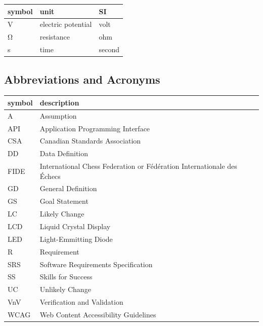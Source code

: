 \documentclass[12pt]{article}
\begin{document}
\begin{table}[ht]
  \noindent \begin{tabular}{l l l} 
    \toprule		
    \textbf{symbol} & \textbf{unit} & \textbf{SI}\\
    \midrule 
    \si{\volt} & electric potential & volt\\
    \si{\ohm} & resistance	& ohm\\
    \si{\second} & time & second\\
    \bottomrule
  \end{tabular}
\end{table}

\subsection{Abbreviations and Acronyms}
\begin{tabular}{l l} 
  \toprule		
  \textbf{symbol} & \textbf{description}\\
  \midrule 
  A & Assumption\\
  API & Application Programming Interface\\
  CSA & Canadian Standards Association\\
  DD & Data Definition\\
  FIDE & International Chess Federation or Fédération Internationale des Échecs\\
  GD & General Definition\\
  GS & Goal Statement\\
  LC & Likely Change\\
  LCD & Liquid Crystal Display\\
  LED & Light-Emmitting Diode\\
  R & Requirement\\
  SRS & Software Requirements Specification\\
  SS & Skills for Success\\
  UC & Unlikely Change\\
  VnV & Verification and Validation\\
  WCAG & Web Content Accessibility Guidelines\\
  \bottomrule
\end{tabular}\\
\end{document}
